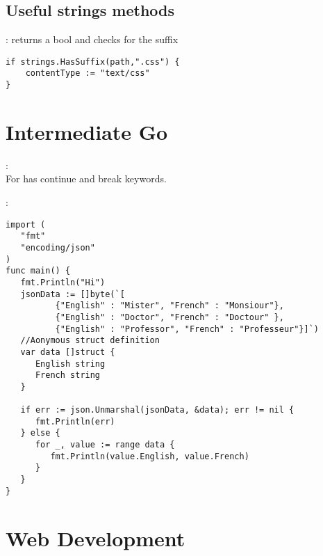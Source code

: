 \subsection{Useful strings methods}
\begin{note}[HasSuffix]: returns a bool and checks for the suffix
\begin{lstlisting}[language=Golang]
if strings.HasSuffix(path,".css") {
	contentType := "text/css"
}
\end{lstlisting}
\end{note}
\section{Intermediate Go}
\begin{note}[For]:\\
	For has continue and break keywords.
\end{note}
\begin{note}:\\
\begin{lstlisting}[language=Golang]
import (
   "fmt"
   "encoding/json"	
)
func main() {
   fmt.Println("Hi")
   jsonData := []byte(`[
	      {"English" : "Mister", "French" : "Monsiour"},
	      {"English" : "Doctor", "French" : "Doctour" },
	      {"English" : "Professor", "French" : "Professeur"}]`)
   //Aonymous struct definition
   var data []struct {
      English string
      French string
   } 

   if err := json.Unmarshal(jsonData, &data); err != nil {
      fmt.Println(err)
   } else {
      for _, value := range data {
         fmt.Println(value.English, value.French)
      }	
   }
}
\end{lstlisting}
\end{note}
\section{Web Development}
